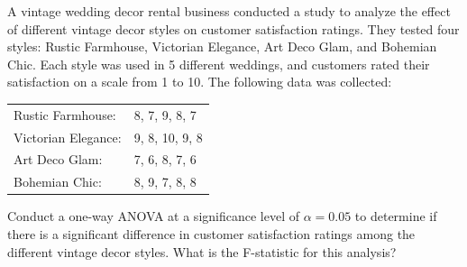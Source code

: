 \documentclass[border=10pt]{standalone}
\begin{document}
\begin{tcolorbox}[
    enhanced,
    colback=decorbackgroundgray,
    colframe=decorframeblue,
    arc=8pt,
    boxrule=1.5pt,
    fontupper=\sffamily\large,
    width=\textwidth
]
A vintage wedding decor rental business conducted a study to analyze the effect of different vintage decor styles on customer satisfaction ratings. They tested four styles: Rustic Farmhouse, Victorian Elegance, Art Deco Glam, and Bohemian Chic. Each style was used in 5 different weddings, and customers rated their satisfaction on a scale from 1 to 10. The following data was collected:

\vspace{0.5em}
\begin{tabular}{ll}
Rustic Farmhouse: & 8, 7, 9, 8, 7 \\
Victorian Elegance: & 9, 8, 10, 9, 8 \\
Art Deco Glam: & 7, 6, 8, 7, 6 \\
Bohemian Chic: & 8, 9, 7, 8, 8
\end{tabular}
\vspace{0.5em}

Conduct a one-way ANOVA at a significance level of $\alpha = 0.05$ to determine if there is a significant difference in customer satisfaction ratings among the different vintage decor styles. What is the F-statistic for this analysis?
\end{tcolorbox}
\end{document}
